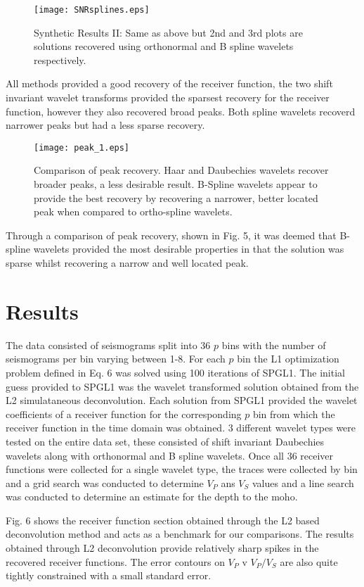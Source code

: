 \documentclass[jgrga]{agutex}
\begin{document}
\begin{article}
\begin{figure}
\noindent\texttt{[image: SNRsplines.eps]}
\caption{ Synthetic Results II: Same as above but 2nd and 3rd plots are solutions recovered using orthonormal and B spline wavelets respectively.}
\end{figure}

All methods provided a good recovery of the receiver function, the two shift invariant wavelet transforms provided the sparsest recovery for the receiver function, however they also recovered broad peaks. Both spline wavelets recoverd narrower peaks but had a less sparse recovery. 

\begin{figure}
\noindent\texttt{[image: peak\_1.eps]}
\caption{Comparison of peak recovery. Haar and Daubechies wavelets recover broader peaks, a less desirable result. B-Spline wavelets appear to provide the best recovery by recovering a narrower, better located peak when compared to ortho-spline wavelets.}
\end{figure}

Through a comparison of peak recovery, shown in Fig. 5, it was deemed that B-spline wavelets provided the most desirable properties in that the solution was sparse whilst recovering a narrow and well located peak. 
\section{Results}

The data consisted of seismograms split into 36 $p$ bins with the number of seismograms per bin varying between 1-8. For each $p$ bin the L1 optimization problem defined in Eq. 6 was solved using 100 iterations of SPGL1. The initial guess provided to SPGL1 was the wavelet transformed solution obtained from the L2 simulataneous deconvolution. Each solution from SPGL1 provided the wavelet coefficients of a receiver function for the corresponding $p$ bin from which the receiver function in the time domain was obtained. 3 different wavelet types were tested on the entire data set, these consisted of shift invariant Daubechies wavelets along with orthonormal and B spline wavelets. Once all 36 receiver functions were collected for a single wavelet type, the traces were collected by bin and a grid search was conducted to determine $V_{P}$ ans $V_{S}$ values and a line search was conducted to determine an estimate for the depth to the moho. 

Fig. 6 shows the receiver function section obtained through the L2 based deconvolution method and acts as a benchmark for our comparisons. The results obtained through L2 deconvolution provide relatively sharp spikes in the recovered receiver functions. The error contours on $V_{P}$ v $V_{P}/V_{S}$ are also quite tightly constrained with a small standard error. 



\end{article}
\end{document}
